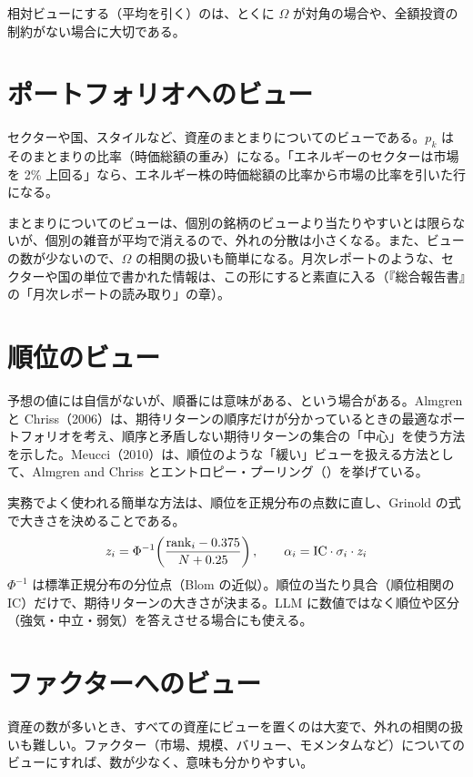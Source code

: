 相対ビューにする（平均を引く）のは、とくに $\Omega$ が対角の場合や、全額投資の制約がない場合に大切である。

\section{ポートフォリオへのビュー}

セクターや国、スタイルなど、資産のまとまりについてのビューである。$p_k$ はそのまとまりの比率（時価総額の重み）になる。「エネルギーのセクターは市場を 2\% 上回る」なら、エネルギー株の時価総額の比率から市場の比率を引いた行になる。

まとまりについてのビューは、個別の銘柄のビューより当たりやすいとは限らないが、個別の雑音が平均で消えるので、外れの分散は小さくなる。また、ビューの数が少ないので、$\Omega$ の相関の扱いも簡単になる。月次レポートのような、セクターや国の単位で書かれた情報は、この形にすると素直に入る（『総合報告書』の「月次レポートの読み取り」の章）。

\section{順位のビュー}

予想の値には自信がないが、順番には意味がある、という場合がある。Almgren と Chriss（2006）は、期待リターンの順序だけが分かっているときの最適なポートフォリオを考え、順序と矛盾しない期待リターンの集合の「中心」を使う方法を示した。Meucci（2010）は、順位のような「緩い」ビューを扱える方法として、Almgren and Chriss とエントロピー・プーリング（）を挙げている。

実務でよく使われる簡単な方法は、順位を正規分布の点数に直し、Grinold の式で大きさを決めることである。
\begin{equation}
z_i=\Phi^{-1}\!\left(\frac{\mathrm{rank}_i-0.375}{N+0.25}\right),\qquad
\alpha_i=\mathrm{IC}\cdot\sigma_i\cdot z_i
\end{equation}
$\Phi^{-1}$ は標準正規分布の分位点（Blom の近似）。順位の当たり具合（順位相関の IC）だけで、期待リターンの大きさが決まる。LLM に数値ではなく順位や区分（強気・中立・弱気）を答えさせる場合にも使える。

\section{ファクターへのビュー}

資産の数が多いとき、すべての資産にビューを置くのは大変で、外れの相関の扱いも難しい。ファクター（市場、規模、バリュー、モメンタムなど）についてのビューにすれば、数が少なく、意味も分かりやすい。

